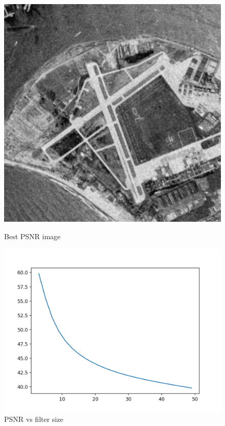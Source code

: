 \documentclass{article}
\begin{document}
    \begin{figure}[!htb]
      \includegraphics[scale=0.3]{./basic_denoising/sandiego/average_best_gaussian.png}
      \caption{Best PSNR image}
    \endminipage \hfill
      \includegraphics[scale=.45]{./basic_denoising/sandiego/average_psnr_gaussian.png}
      \caption{PSNR vs filter size}
    \endminipage
    \end{figure}
    
\end{document}

